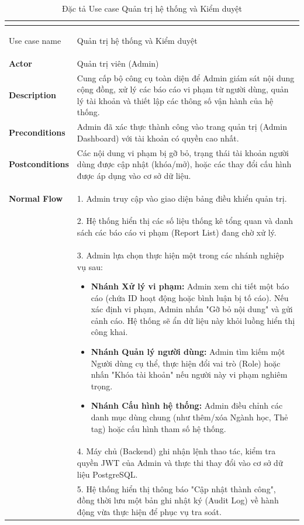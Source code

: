 \renewcommand{\arraystretch}{1.5}
\begin{xltabular}{\textwidth}{|>{\bfseries}p{3.5cm}|X|}
    \caption{Đặc tả Use case Quản trị hệ thống và Kiểm duyệt} \label{tab:uc_quantri} \\
    \hline
    \endfirsthead
    \caption[]{Đặc tả Use case Quản trị hệ thống và Kiểm duyệt} \\
    \hline
    \endhead
    \hline
    \endfoot
    \hline
    \endlastfoot

    Use case name & Quản trị hệ thống và Kiểm duyệt \\ \hline
    Actor & Quản trị viên (Admin) \\ \hline
    Description & Cung cấp bộ công cụ toàn diện để Admin giám sát nội dung cộng đồng, xử lý các báo cáo vi phạm từ người dùng, quản lý tài khoản và thiết lập các thông số vận hành của hệ thống. \\ \hline
    Preconditions & Admin đã xác thực thành công vào trang quản trị (Admin Dashboard) với tài khoản có quyền cao nhất. \\ \hline
    Postconditions & Các nội dung vi phạm bị gỡ bỏ, trạng thái tài khoản người dùng được cập nhật (khóa/mở), hoặc các thay đổi cấu hình được áp dụng vào cơ sở dữ liệu. \\ \hline
    
    \textbf{Normal Flow} & 1. Admin truy cập vào giao diện bảng điều khiển quản trị. \\ 
    & 2. Hệ thống hiển thị các số liệu thống kê tổng quan và danh sách các báo cáo vi phạm (Report List) đang chờ xử lý. \\ 
    & 3. Admin lựa chọn thực hiện một trong các nhánh nghiệp vụ sau:
    \vspace{0.2cm}
    \begin{itemize}[leftmargin=*, noitemsep]
        \item \textbf{Nhánh Xử lý vi phạm:} Admin xem chi tiết một báo cáo (chứa ID hoạt động hoặc bình luận bị tố cáo). Nếu xác định vi phạm, Admin nhấn "Gỡ bỏ nội dung" và gửi cảnh cáo. Hệ thống sẽ ẩn dữ liệu này khỏi luồng hiển thị công khai.
        \item \textbf{Nhánh Quản lý người dùng:} Admin tìm kiếm một Người dùng cụ thể, thực hiện đổi vai trò (Role) hoặc nhấn "Khóa tài khoản" nếu người này vi phạm nghiêm trọng.
        \item \textbf{Nhánh Cấu hình hệ thống:} Admin điều chỉnh các danh mục dùng chung (như thêm/xóa Ngành học, Thẻ tag) hoặc cấu hình tham số hệ thống.
    \end{itemize} \\ 
    & 4. Máy chủ (Backend) ghi nhận lệnh thao tác, kiểm tra quyền JWT của Admin và thực thi thay đổi vào cơ sở dữ liệu PostgreSQL. \\ 
    & 5. Hệ thống hiển thị thông báo "Cập nhật thành công", đồng thời lưu một bản ghi nhật ký (Audit Log) về hành động vừa thực hiện để phục vụ tra soát. \\ \hline
    

\end{xltabular}
